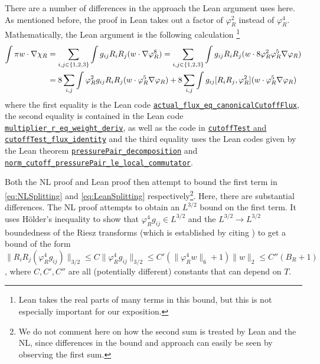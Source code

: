 \documentclass[10pt, a4paper, reqno]{amsart}
\numberwithin{equation}{section}
\renewcommand{\leq}{\leqslant}
\theoremstyle{definition}
\theoremstyle{definition}
\newcounter{constant}
\begin{document}
There are a number of differences in the approach the Lean argument uses here. As mentioned before, the proof in Lean takes out a factor of $\varphi_R^2$ instead of $\varphi_R^4$. Mathematically, the Lean argument is the following calculation \footnote{Lean takes the real parts of many terms in this bound, but this is not especially important for our exposition.}
\begin{align} 
	\int \pi w \cdot \nabla \chi_R &= \sum_{i, j \in \{1,2,3\}} \int g_{ij} R_i R_j (w \cdot \nabla \varphi_R^8) =   \sum_{i, j \in \{1,2,3\}} \int g_{ij} R_i R_j (w \cdot 8\varphi^2_R\varphi^5_R \nabla \varphi_R) \notag\\&=   8\sum_{i, j} \int \varphi_R^2 g_{ij} R_i R_j (w \cdot \varphi_R^5 \nabla \varphi_R)  + 8 \sum_{i, j} \int g_{ij} [R_i R_j,\varphi_R^2] (w \cdot \varphi_R^5 \nabla \varphi_R)  \label{eq:LeanSplitting}
\end{align}
where the first equality is the Lean code \href{https://github.com/openai/NavierStokesAndEuler/blob/main/NavierStokes/R3/PressureFlux.lean#L211-L219}{\texttt{actual\_flux\_eq\_canonicalCutoffFlux}}, the second equality is contained in the Lean code \href{https://github.com/openai/NavierStokesAndEuler/blob/f9e8bc5b38b6e212696e8a30e3e91517af887bbd/NavierStokes/R3/PressureFluxTest.lean#L26-L34}{\texttt{multiplier\_r\_eq\_weight\_deriv}}, as well as the code in \href{https://github.com/openai/NavierStokesAndEuler/blob/f9e8bc5b38b6e212696e8a30e3e91517af887bbd/NavierStokes/R3/PressureFluxTest.lean#L284-L291}{\texttt{cutoffTest} and \texttt{cutoffTest\_flux\_identity}} and the third equality uses the Lean codes given by the Lean theorem  \href{https://github.com/openai/NavierStokesAndEuler/blob/f9e8bc5b38b6e212696e8a30e3e91517af887bbd/NavierStokes/R3/PressureFlux.lean#L251-L267}{\texttt{pressurePair\_decomposition}} and  \href{https://github.com/openai/NavierStokesAndEuler/blob/f9e8bc5b38b6e212696e8a30e3e91517af887bbd/NavierStokes/R3/PressureFlux.lean#L372-L377}{\texttt{norm\_cutoff\_pressurePair\_le\_local\_commutator}}.

Both the NL proof and Lean proof then attempt to bound the first term in \eqref{eq:NLSplitting} and \eqref{eq:LeanSplitting} respectively\footnote{We do not comment here on how the second sum is treated by Lean and the NL, since differences in the bound and approach can easily be seen by observing the first sum.}. Here, there are substantial differences. The NL proof attempts to obtain an $L^{3/2}$ bound on the first term. It uses H\"older's inequality to show that $\varphi_R^4 g_{ij} \in L^{3/2}$ and the $L^{3/2} \to L^{3/2}$ boundedness of the Riesz transforms (which is established by citing \cite{SteinSingular}) to get a bound of the form $\|R_i R_j (\varphi^4_R g_{ij})\|_{3/2} \leq C \|\varphi^4_R g_{ij}\|_{3/2} \leq C' (\|\varphi^4_Rw\|_6+1)\|w\|_2 \leq C'' (B_R + 1)$, where $C,C',C''$ are all (potentially different) constants that can depend on $T$.
\end{document}
